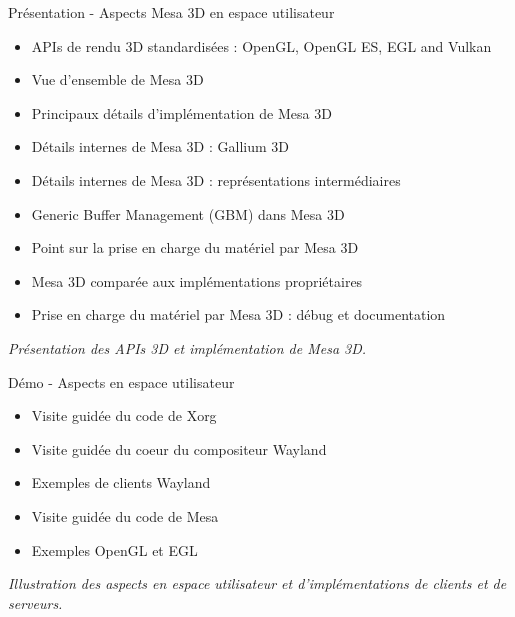 \documentclass[a4paper,12pt,obeyspaces,spaces,hyphens]{article}
\begin{document}
\feagendatwocolumn
{Présentation - Aspects Mesa 3D en espace utilisateur}
{
  \begin{itemize}
  \item APIs de rendu 3D standardisées : OpenGL, OpenGL ES, EGL and Vulkan
  \item Vue d'ensemble de Mesa 3D
  \item Principaux détails d'implémentation de Mesa 3D
  \item Détails internes de Mesa 3D : Gallium 3D
  \item Détails internes de Mesa 3D : représentations intermédiaires
  \item Generic Buffer Management (GBM) dans Mesa 3D
  \item Point sur la prise en charge du matériel par Mesa 3D
  \item Mesa 3D comparée aux implémentations propriétaires
  \item Prise en charge du matériel par Mesa 3D : débug et documentation
  \end{itemize}
  \vspace{0.5em}
  {\em Présentation des APIs 3D et implémentation de Mesa 3D.}
}
{Démo - Aspects en espace utilisateur}
{
  \begin{itemize}
  \item Visite guidée du code de Xorg
  \item Visite guidée du coeur du compositeur Wayland
  \item Exemples de clients Wayland
  \item Visite guidée du code de Mesa
  \item Exemples OpenGL et EGL
  \end{itemize}
  \vspace{0.5em}
  {\em Illustration des aspects en espace utilisateur et
       d'implémentations de clients et de serveurs.}
}
\end{document}
